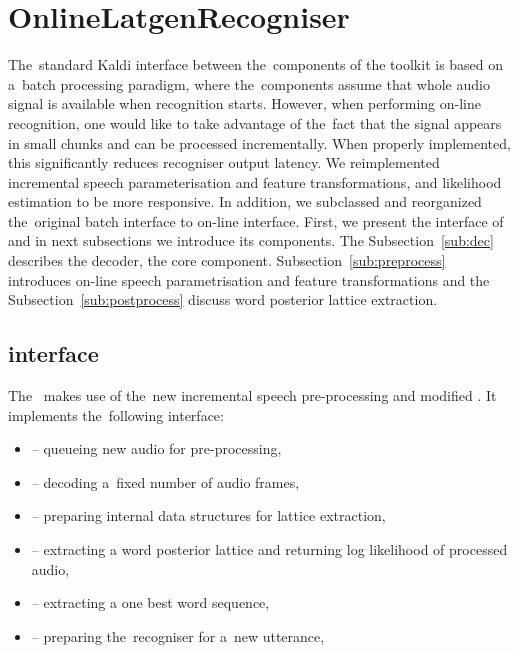 \section{OnlineLatgenRecogniser}
\label{sec:rec}

The~standard Kaldi interface between the~components of the toolkit is based on a~batch processing paradigm, where the~components assume that whole audio signal is available when recognition starts.
However, when performing on-line recognition, one would like to take advantage of the~fact that the signal appears in small chunks and can be processed incrementally.
When properly implemented, this significantly reduces recogniser output latency.
We reimplemented incremental speech parameterisation and feature transformations, and likelihood estimation to be more responsive.
In addition, we subclassed  and reorganized the~original batch interface to on-line interface.
First, we present the interface of  and in next subsections we introduce its components.
The Subsection~\ref{sub:dec} describes the decoder, the core component.
Subsection~\ref{sub:preprocess} introduces on-line speech parametrisation and feature transformations and the Subsection~\ref{sub:postprocess} discuss word posterior lattice extraction.

\subsection{ interface}
\label{sub:verb_c_}
The~ makes use of the~new incremental speech pre-processing and modified .
It implements the~following interface:
\begin{itemize}
\item {} -- queueing new audio for pre-processing,
\item {} -- decoding a~fixed number of audio frames,
\item {} -- preparing internal data structures for lattice extraction,
\item {} -- extracting a word posterior lattice and returning log likelihood of processed audio,
\item {} -- extracting a one best word sequence,
\item {} -- preparing the~recogniser for a~new utterance,
\end{itemize}

